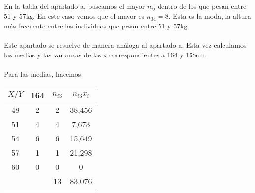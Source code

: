 \subproblem
    En la tabla del apartado a, buscamos el mayor $n_{ij}$ dentro de los que pesan entre 51 y 57kg. En este caso vemos que el mayor es $n_{34}=8$. Esta es la moda, la altura más frecuente entre los individuos que pesan entre 51 y 57kg. \\ \\
    
\subproblem
    Este apartado se resuelve de manera análoga al apartado a. Esta vez calculamos las medias y las varianzas de las x correspondientes a 164 y 168cm. \\ \\
    Para las medias, hacemos 
    \begin{center}
    \begin{tabular}{| c | c | c | c |}
        \hline
        $X / Y$ & 164 & $n_{i3}$ & $n_{i3}x_i$\\ \hline
        48 & 2 & 2 & 38,456 \\ \hline
        51 & 4 & 4 & 7,673 \\ \hline
        54 & 6 & 6 & 15,649 \\ \hline
        57 & 1 & 1 & 21,298 \\ \hline
        60 & 0 & 0 & 0 \\ \hline
        & & 13 & 83.076 \\
        \hline
    \end{tabular} \\
    \end{center}
    
